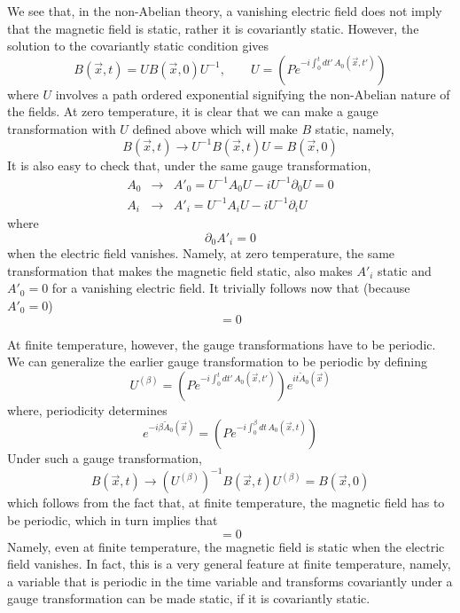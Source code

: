 \documentclass[a4paper,12pt]{article}
\begin{document}
We see that, in the non-Abelian theory, a vanishing electric field
does not imply that the magnetic field is static, rather it is
covariantly static. However, the solution to the covariantly static
condition gives
\begin{equation}
B(\vec{x},t) = U B(\vec{x},0) U^{-1},\qquad U =
\left(P e^{-i\int_{0}^{t}dt'\,A_{0}(\vec{x},t')}\right)
\end{equation}
where $U$ involves a path ordered exponential signifying the
non-Abelian nature of the fields. At zero temperature, it is clear
that we  can make a gauge transformation with $U$ defined above which
will make $B$ static, namely,
\begin{equation}
B(\vec{x},t)\rightarrow U^{-1}B(\vec{x},t)U = B(\vec{x},0)
\end{equation}
It is also easy to check that, under the same gauge transformation,
\begin{eqnarray}
A_{0}& \rightarrow & A'_{0} = U^{-1}A_{0}U - iU^{-1}\partial_{0}U =
0\nonumber\\
A_{i}& \rightarrow & A'_{i} = U^{-1}A_{i}U - iU^{-1}\partial_{i}U
\end{eqnarray}
where
\begin{equation}
\partial_{0}A'_{i} = 0
\end{equation}
when the electric field vanishes. Namely, at zero temperature, the
same transformation that makes the magnetic field static, also makes
$A'_{i}$ static and $A'_{0} = 0$ for a vanishing electric field. It
trivially follows now that (because $A'_{0}=0$)
\begin{equation}
[A'_{0}, A'_{i}] = 0
\end{equation}

At finite temperature, however, the gauge transformations have to be
periodic. We can generalize the earlier gauge transformation to be
periodic by defining
\begin{equation}
U^{(\beta)} = \left(P e^{-i\int_{0}^{t}dt'\,A_{0}(\vec{x},t')}\right)
e^{it\tilde{A}_{0}(\vec{x})}
\end{equation}
where, periodicity determines
\begin{equation}
e^{-i\beta \tilde{A}_{0}(\vec{x})} = \left(P e^{-i\int_{0}^{\beta}dt\,
A_{0}(\vec{x},t)}\right)
\end{equation}
Under such a gauge transformation,
\begin{equation}
B(\vec{x},t)\rightarrow (U^{(\beta)})^{-1} B(\vec{x},t) U^{(\beta)} =
B(\vec{x},0) 
\end{equation}
which follows from the fact that, at finite temperature, the magnetic
field has to be periodic, which in turn implies that
\begin{equation}
[A_{0}(\vec{x},t), B(\vec{x},0)] = 0
\end{equation}
Namely, even at finite temperature, the magnetic field is static when
the electric field vanishes. In fact, this is a very general feature
at finite temperature, namely, a variable that is periodic in the time
variable and transforms covariantly under a gauge transformation can
be made static, if it is covariantly static.
\end{document}
